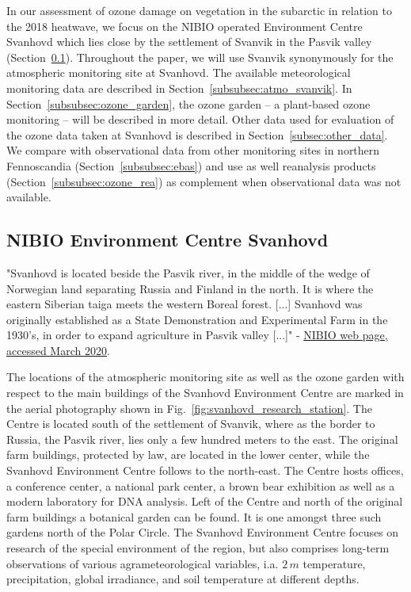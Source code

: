 \documentclass[bg, manuscript]{copernicus}
\begin{document}
In our assessment of ozone damage on vegetation in the subarctic in relation to the 2018 heatwave, we focus on the NIBIO operated Environment Centre Svanhovd which lies close by the settlement of Svanvik in the Pasvik valley (Section~\ref{subsec:svanhovd}). Throughout the paper, we will use Svanvik synonymously for the atmospheric monitoring site at Svanhovd. The available meteorological monitoring data are described in Section~\ref{subsubsec:atmo_svanvik}. In Section~\ref{subsubsec:ozone_garden}, the ozone garden -- a plant-based ozone monitoring -- will be described in more detail. Other data used for evaluation of the ozone data taken at Svanhovd is described in Section~\ref{subsec:other_data}. We compare with observational data from other monitoring sites in northern Fennoscandia (Section~\ref{subsubsec:ebas}) and use as well reanalysis products (Section~\ref{subsubsec:ozone_rea}) as complement when observational data was not available.

\subsection{NIBIO Environment Centre Svanhovd}
\label{subsec:svanhovd}
"Svanhovd is located beside the Pasvik river, in the middle of the wedge of Norwegian land separating Russia and Finland in the north. It is where the eastern Siberian taiga meets the western Boreal forest. [...] Svanhovd was originally established as a State Demonstration and Experimental Farm in the 1930's, in order to expand agriculture in Pasvik valley [...]" - \href{https://www.nibio.no/en/about-eng/addresses/northern-norway/svanhovd}{NIBIO web page, accessed March 2020}.

The locations of the atmospheric monitoring site as well as the ozone garden with respect to the main buildings of the Svanhovd Environment Centre are marked in the aerial photography shown in Fig.~\ref{fig:svanhovd_research_station}. The Centre is located south of the settlement of Svanvik, where as the border to Russia, the Pasvik river, lies only a few hundred meters to the east. The original farm buildings, protected by law, are located in the lower center, while the Svanhovd Environment Centre follows to the north-east. The Centre hosts offices, a conference center, a national park center, a brown bear exhibition as well as a modern laboratory for DNA analysis. Left of the Centre and north of the original farm buildings a botanical garden can be found. It is one amongst three such gardens north of the Polar Circle. The Svanhovd Environment Centre focuses on research of the special environment of the region, but also comprises long-term observations of various agrameteorological variables, i.a. $2\,\unit{m}$ temperature, precipitation, global irradiance, and soil temperature at different depths.
\end{document}
